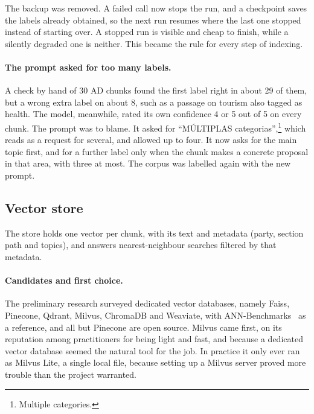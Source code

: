 The backup was removed. A failed call now stops the run, and a checkpoint
saves the labels already obtained, so the next run resumes where the last one
stopped instead of starting over. A stopped run is visible and cheap to
finish, while a silently degraded one is neither. This became the rule for
every step of indexing.

\paragraph{The prompt asked for too many labels.} A check by hand of 30 AD
chunks found the first label right in about 29 of them, but a wrong extra
label on about 8, such as a passage on tourism also tagged as health. The
model, meanwhile, rated its own confidence 4 or 5 out of 5 on every chunk. The
prompt was to blame. It asked for ``MÚLTIPLAS categorias'',\footnote{Multiple categories.} which reads as a request for several, and allowed up to four. It
now asks for the main topic first, and for a further label only when the chunk
makes a concrete proposal in that area, with three at most. The corpus was
labelled again with the new prompt.

\subsection{Vector store} \label{subsec:vectorstore}

The store holds one vector per chunk, with its text and metadata (party,
section path and topics), and answers nearest-neighbour searches filtered by
that metadata.

\paragraph{Candidates and first choice.} The preliminary research surveyed
dedicated vector databases, namely Faiss, Pinecone, Qdrant, Milvus, ChromaDB
and Weaviate, with ANN-Benchmarks~\citep{aumuller2020annbenchmarks} as a
reference, and all but Pinecone are open source. Milvus came first, on its
reputation among practitioners for being light and fast, and because a
dedicated vector database seemed the natural tool for the job. In practice it
only ever ran as Milvus Lite, a single local file, because setting up a Milvus
server proved more trouble than the project warranted.

